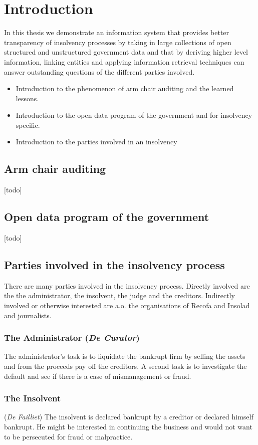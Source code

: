 \section{Introduction}
In this thesis we demonstrate an information system that provides better transparency of insolvency processes by taking in large collections of open structured and unstructured government data and that by deriving higher level information, linking entities and applying information retrieval techniques can answer outstanding questions of the different parties involved.

\begin{itemize}
\item Introduction to the phenomenon of arm chair auditing and the learned lessons.
\item Introduction to the open data program of the government and for insolvency specific.
\item Introduction to the parties involved in an insolvency
\end{itemize}

\subsection{Arm chair auditing}
[todo]
\subsection{Open data program of the government}
[todo]
\subsection{Parties involved in the insolvency process}
There are many parties involved in the insolvency process. Directly involved are the the administrator, the insolvent, the judge and the creditors. Indirectly involved or otherwise interested are a.o. the organisations of Recofa and Insolad and journalists. 

\subsubsection{The Administrator (\textit{De Curator})}
The administrator's task is to liquidate the bankrupt firm by selling the assets and from the proceeds pay off the creditors. A second task is to investigate the default and see if there is a case of mismanagement or fraud.

\subsubsection{The Insolvent} (\textit{De Failliet})
The insolvent is declared bankrupt by a creditor or declared himself bankrupt. He might be interested in continuing the business and would not want to be persecuted for fraud or malpractice.

